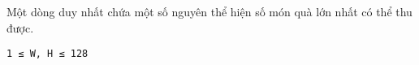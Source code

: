 Một dòng duy nhất chứa một số nguyên thể hiện số món quà lớn nhất có thể thu được.
\begin{verbatim}
1 ≤ W, H ≤ 128
\end{verbatim}